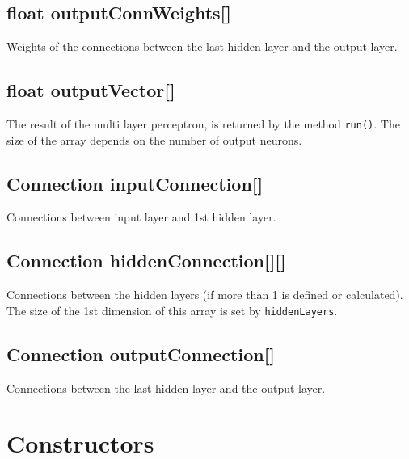 \subsection{float outputConnWeights[]}
Weights of the connections between the last hidden layer and the output layer.

\subsection{float outputVector[]}
The result of the multi layer perceptron, is returned by the method \texttt{run()}. The size of the array depends on the number of output neurons.

\subsection{Connection inputConnection[]}
Connections between input layer and 1st hidden layer.

\subsection{Connection hiddenConnection[][]}
Connections between the hidden layers (if more than 1 is defined or calculated). The size of the 1st dimension of this array is set by \texttt{hiddenLayers}.

\subsection{Connection outputConnection[]}
Connections between the last hidden layer and the output layer.

\section{Constructors}

